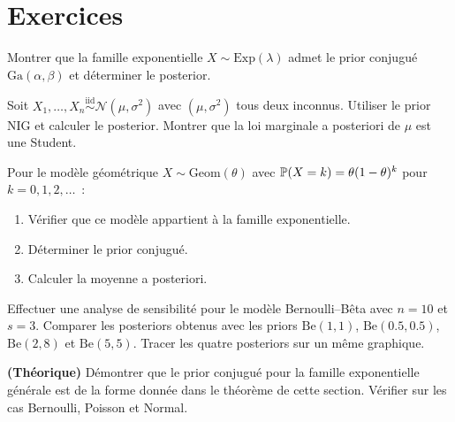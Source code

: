 \section{Exercices}

\begin{exercice}
Montrer que la famille exponentielle $X \sim \text{Exp}(\lambda)$ admet
le prior conjugu\'e $\text{Ga}(\alpha, \beta)$ et d\'eterminer le posterior.
\end{exercice}

\begin{exercice}
Soit $X_1, \ldots, X_n \overset{\text{iid}}{\sim} \mathcal{N}(\mu, \sigma^2)$
avec $(\mu, \sigma^2)$ tous deux inconnus. Utiliser le prior NIG et
calculer le posterior. Montrer que la loi marginale a posteriori de $\mu$
est une Student.
\end{exercice}

\begin{exercice}
Pour le mod\`ele g\'eom\'etrique $X \sim \text{Geom}(\theta)$ avec
$\mathbb{P}(X = k) = \theta(1-\theta)^k$ pour $k = 0, 1, 2, \ldots$~:
\begin{enumerate}
  \item V\'erifier que ce mod\`ele appartient \`a la famille exponentielle.
  \item D\'eterminer le prior conjugu\'e.
  \item Calculer la moyenne a posteriori.
\end{enumerate}
\end{exercice}

\begin{exercice}
Effectuer une analyse de sensibilit\'e pour le mod\`ele Bernoulli--B\^eta
avec $n = 10$ et $s = 3$. Comparer les posteriors obtenus avec les
priors $\text{Be}(1,1)$, $\text{Be}(0.5, 0.5)$, $\text{Be}(2, 8)$
et $\text{Be}(5, 5)$. Tracer les quatre posteriors sur un m\^eme
graphique.
\end{exercice}

\begin{exercice}
\textbf{(Th\'eorique)} D\'emontrer que le prior conjugu\'e pour la
famille exponentielle g\'en\'erale est de la forme donn\'ee dans le
th\'eor\`eme de cette section. V\'erifier sur les cas Bernoulli,
Poisson et Normal.
\end{exercice}
